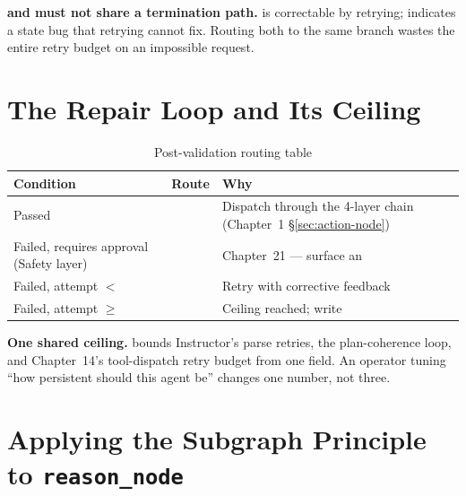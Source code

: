 \begin{warningbox}
\textbf{ and  must not share a
termination path.}   is correctable by retrying;
 indicates a state bug that retrying cannot fix.  Routing
both to the same branch wastes the entire retry budget on an impossible
request.
\end{warningbox}

\section{The Repair Loop and Its Ceiling}
\label{sec:repair-loop}

\begin{table}[htbp]
\centering
\caption{Post-validation routing table}
\label{tab:routing-table}
\renewcommand{\arraystretch}{1.4}
\begin{tabularx}{\linewidth}{@{} l l P{4.6cm} @{}}
\toprule
\textbf{Condition} & \textbf{Route} & \textbf{Why} \\
\midrule
Passed                                     & 
  & Dispatch through the 4-layer chain (Chapter~1 §\ref{sec:action-node}) \\
Failed, requires approval (Safety layer)   & 
  & Chapter~21 --- surface an  \\
Failed, attempt $<$     & 
  & Retry with corrective feedback \\
Failed, attempt $\geq$  & 
  & Ceiling reached; write  \\
\bottomrule
\end{tabularx}
\end{table}

\begin{notebox}
\textbf{One shared ceiling.}  
bounds Instructor's parse retries, the plan-coherence
 loop, and Chapter~14's tool-dispatch retry
budget from one field.  An operator tuning ``how persistent should this
agent be'' changes one number, not three.
\end{notebox}

\section{Applying the Subgraph Principle to \texttt{reason\_node}}
\label{sec:ch4-subgraph}

